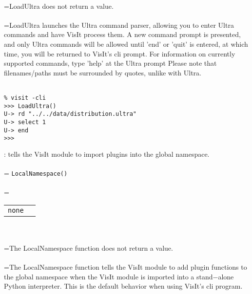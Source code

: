 \documentclass[10pt,a4paper]{report}
\begin{document}
 \\ 
\hangindent=\parindent LoadUltra does not return a value. \\[-3mm] 

 \\ 
\hangindent=\parindent LoadUltra launches the Ultra command parser, allowing you to enter Ultra commands and have VisIt process them.  A new command prompt is presented, and only Ultra commands will be allowed until 'end' or 'quit' is entered, at which time, you will be returned to VisIt's cli prompt.  For information on currently supported commands, type 'help' at the Ultra prompt Please note that filenames/paths must be surrounded by quotes, unlike with Ultra. \\[-3mm] 

\\[-6mm]
\begin{verbatim}% visit -cli
>>> LoadUltra()
U-> rd "../../data/distribution.ultra"
U-> select 1
U-> end
>>>
\end{verbatim}
\newpage


{}
: tells the VisIt module to import plugins into the global namespace.\\[-3mm]

 \\ 
\hangindent=\parindent 
\verb!LocalNamespace()!\\ [-3mm]

 \\ 
\hangindent=\parindent 
\begin{tabular}{ll}
\verb!none! &  \\
\end{tabular} \\[-2mm]


 \\ 
\hangindent=\parindent The LocalNamespace function does not return a value. \\[-3mm] 

 \\ 
\hangindent=\parindent The LocalNamespace function tells the VisIt module to add plugin functions to the global namespace when the VisIt module is imported into a stand$-$alone Python interpreter. This is the default behavior when using VisIt's cli program. \\[-3mm] 
\end{document}
